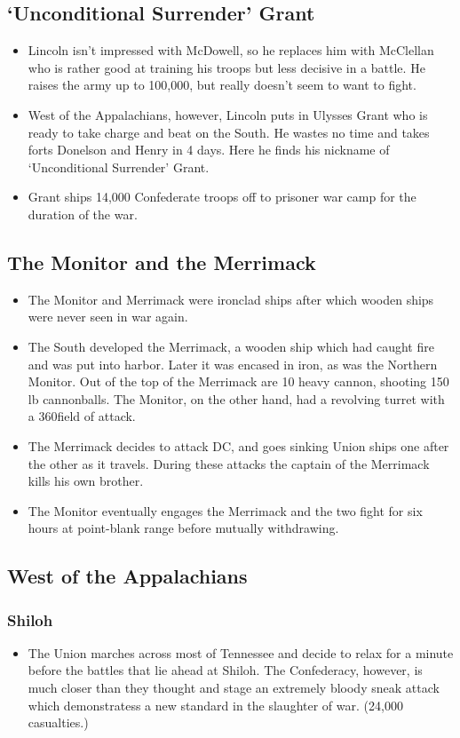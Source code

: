 \documentclass{article}
\begin{document}
  \subsection{`Unconditional Surrender' Grant}
    \begin{itemize}
      \item Lincoln isn't impressed with McDowell, so he replaces him with McClellan who is rather good at training his troops but less decisive in a battle. He raises the army up to 100,000, but really doesn't seem to want to fight.
      \item West of the Appalachians, however, Lincoln puts in Ulysses Grant who is ready to take charge and beat on the South. He wastes no time and takes forts Donelson and Henry in 4 days. Here he finds his nickname of `Unconditional Surrender' Grant.
      \item Grant ships 14,000 Confederate troops off to prisoner war camp for the duration of the war.
    \end{itemize}
  \subsection{The Monitor and the Merrimack}
    \begin{itemize}
      \item The Monitor and Merrimack were ironclad ships after which wooden ships were never seen in war again.
      \item The South developed the Merrimack, a wooden ship which had caught fire and was put into harbor. Later it was encased in iron, as was the Northern Monitor. Out of the top of the Merrimack are 10 heavy cannon, shooting 150 lb cannonballs. The Monitor, on the other hand, had a revolving turret with a 360\textdegree field of attack.
      \item The Merrimack decides to attack DC, and goes sinking Union ships one after the other as it travels. During these attacks the captain of the Merrimack kills his own brother.
      \item The Monitor eventually engages the Merrimack and the two fight for six hours at point-blank range before mutually withdrawing.
    \end{itemize}
  \subsection{West of the Appalachians}
    \subsubsection{Shiloh}
      \begin{itemize}
        \item The Union marches across most of Tennessee and decide to relax for a minute before the battles that lie ahead at Shiloh. The Confederacy, however, is much closer than they thought and stage an extremely bloody sneak attack which demonstratess a new standard in the slaughter of war. (24,000 casualties.)
      \end{itemize}
\end{document}
